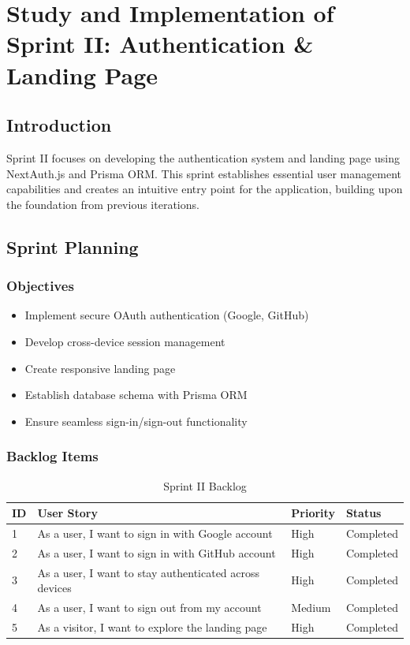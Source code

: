 \chapter[Sprint II]{Study and Implementation of Sprint II: Authentication \& Landing Page}

\section{Introduction}
Sprint II focuses on developing the authentication system and landing page using NextAuth.js and Prisma ORM. This sprint establishes essential user management capabilities and creates an intuitive entry point for the application, building upon the foundation from previous iterations.

\section{Sprint Planning}

\subsection{Objectives}
\begin{itemize}
    \item Implement secure OAuth authentication (Google, GitHub)
    \item Develop cross-device session management
    \item Create responsive landing page
    \item Establish database schema with Prisma ORM
    \item Ensure seamless sign-in/sign-out functionality
\end{itemize}

\subsection{Backlog Items}
\begin{table}[H]
\centering
\caption{Sprint II Backlog}
\label{tab:sprint2_backlog}
\begin{tabular}{|p{1cm}|p{7cm}|p{2cm}|p{2cm}|}
\hline
\textbf{ID} & \textbf{User Story} & \textbf{Priority} & \textbf{Status} \\
\hline
1 & As a user, I want to sign in with Google account & High & Completed \\
\hline
2 & As a user, I want to sign in with GitHub account & High & Completed \\
\hline
3 & As a user, I want to stay authenticated across devices & High & Completed \\
\hline
4 & As a user, I want to sign out from my account & Medium & Completed \\
\hline
5 & As a visitor, I want to explore the landing page & High & Completed \\
\hline
\end{tabular}
\end{table}

